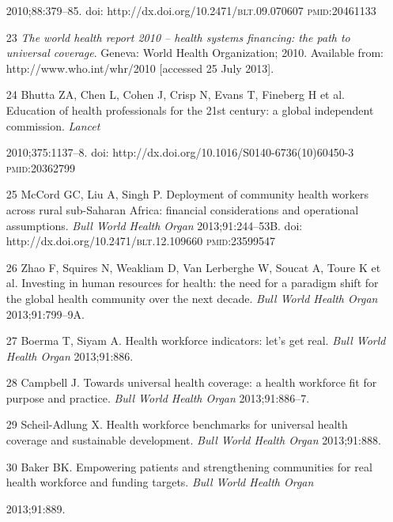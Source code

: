\documentclass{article}
\begin{document}
\begin{itemize}
2010;88:379–85. doi: http://dx.doi.org/10.2471/\textsc{blt}.09.070607 \textsc{pmid}:20461133

\item[23] \textit{The world health report 2010 – health systems financing: the
path to
universal coverage}. Geneva: World Health Organization; 2010. Available from:
http://www.who.int/whr/2010 [accessed 25 July 2013].

\item[24] Bhutta ZA, Chen L, Cohen J, Crisp N, Evans T, Fineberg H et al.
Education of health
professionals for the 21st century: a global independent commission.
\textit{Lancet}

2010;375:1137–8. doi: http://dx.doi.org/10.1016/S0140-6736(10)60450-3
\textsc{pmid}:20362799

\item[25] McCord GC, Liu A, Singh P. Deployment of community health workers
across rural
sub-Saharan Africa: financial considerations and operational assumptions.
\textit{Bull World Health
Organ}
2013;91:244–53B. doi: http://dx.doi.org/10.2471/\textsc{blt}.12.109660
\textsc{pmid}:23599547

\item[26] Zhao F, Squires N, Weakliam D, Van Lerberghe W, Soucat A, Toure K et
al. Investing
in human resources for health: the need for a paradigm shift for the global
health community over
the next decade. \textit{Bull World Health Organ}
2013;91:799–9A.

\item[27] Boerma T, Siyam A. Health workforce indicators: let’s get real.
\textit{Bull World
Health Organ}
2013;91:886.

\item[28] Campbell J. Towards universal health coverage: a health workforce fit
for purpose
and practice. \textit{Bull World Health Organ}
2013;91:886–7.

\item[29] Scheil-Adlung X. Health workforce benchmarks for universal health
coverage and
sustainable development. \textit{Bull World Health Organ}
2013;91:888.

\item[30] Baker BK. Empowering patients and strengthening communities for real
health
workforce and funding targets. \textit{Bull World Health Organ}

2013;91:889.

\end{itemize}
\end{document}
